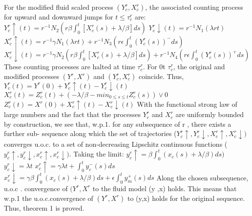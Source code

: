 \newline\newline
For the modified fluid scaled process $(Y_c^r,X_c^r)$, the associated counting process for upward and downward jumps for $t\leq \tau _c^r$ are:
\newline
\newline $Y_c^r \uparrow(t) = r^{-1} N_2(r\beta \int_0^t[X^r_c(s) +\lambda/\beta]ds)$
 \newline $Y_c^r \downarrow(t) = r^{-1} N_1(\lambda rt)$
\newline  $X_c^r \uparrow(t) = r^{-1}\gamma N_1(\lambda rt) +r^{-1} N_3 (r \epsilon \int_0^t(Y^r_c(s))^- ds)$
\newline $X_c^r \downarrow(t) =r^{-1}\gamma N_2(r \beta \int_0^t[X^r_c(s) +\lambda/\beta]ds) +r^{-1} N_4 (r\epsilon\int_0^t(Y^r_c(s))^+ ds)$
\newline\newline
These counting processes are halted at time $\tau_c^r$. For 0\leq t \leq $\tau_c^r$, the original and modified processes $(Y^r , X^r)$ and $(Y_c^r,X_c^r)$ coincide. Thus,
\newline\newline
$Y^r_c(t)=Y^r(0) + Y_c^r \uparrow(t) - Y_c^r \downarrow(t)$
\newline $X^r_c(t)=Z^r_c(t) + (- \lambda/ \beta - min_{0\leq s \leq t} Z^r_c (s)) \vee 0$
\newline $Z^r_c(t)= X^r(0) + X_c^r \uparrow(t) - X_c^r \downarrow(t)$
\newline\newline
With the functional strong law of large numbers and the fact that the processes $Y^r_c$ and $X^r_c $ are uniformly bounded by
construction, we see that, w.p.1. for any subsequence of r , there exists a further sub- sequence along which the set of trajectories ($Y^r_c\uparrow,Y^r_c\downarrow,X^r_c\uparrow,X^r_c\downarrow)$ converges u.o.c. to a set of non-decreasing Lipschitz continuous functions ($y^r_c\uparrow,y^r_c\downarrow,x^r_c\uparrow,x^r_c\downarrow)$. Taking the limit:
\newline
$y^r_c\uparrow= \beta \int_0^t(x_c(s) + \lambda/\beta) ds)$
\newline $y^r_c\downarrow=\lambda t$
\newline $x^r_c\uparrow= \gamma \lambda t + \int_0^t y_c^-(s)ds$
\newline $x^r_c\downarrow= \gamma \beta \int_0^t (x_c(s) +\lambda/\beta) ds + \epsilon \int_0^t y_m^+(s) ds$
\newline\newline
 Along the chosen subsequence, u.o.c . convergence of $(Y^r,X^r$ to the fluid model (y ,x) holds. This means that w.p.1 the u.o.c.convergence of $(Y^r,X^r)$ to (y,x) holds for the original sequence. Thus, theorem 1 is proved. 

